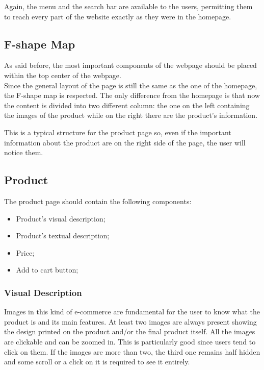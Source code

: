 Again, the menu and the search bar are available to the users, permitting them to reach every part of the 
website exactly as they were in the homepage.

\subsection{F-shape Map}
As said before, the most important components of the webpage should be placed within the top center of the webpage. \\
Since the general layout of the page is still the same as the one of the homepage, the F-shape map
is respected. 
The only difference from the homepage is that now the content is divided into two different column: 
the one on the left containing the images of the product while on the right there are the product's information.

This is a typical structure for the product page so, even if the important information about the product 
are on the right side of the page, the user will notice them.

\subsection{Product}
The product page should contain the following components:
\begin{itemize}
	\item Product’s visual description;
	\item Product’s textual description;
	\item Price;
	\item Add to cart button;
\end{itemize}

\subsubsection{Visual Description}
Images in this kind of e-commerce are fundamental for the user to know what the product is and 
its main features.
At least two images are always present showing the design printed on the product and/or the final 
product itself. All the images are clickable and can be zoomed in. This is particularly good
since users tend to click on them. 
If the images are more than two, the third one remains half hidden and some scroll or a click on it
is required to see it entirely.


